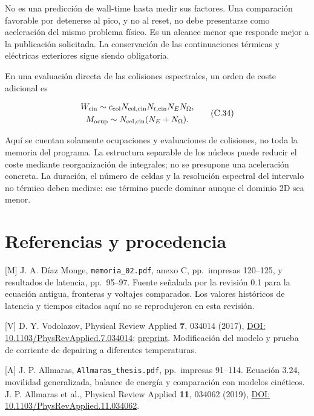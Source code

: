 \documentclass[
  spanish,
  10pt,
  a4paper,
]{article}
\begin{document}
No es una predicción de wall-time hasta medir sus factores. Una
comparación favorable por detenerse al pico, y no al reset, no debe
presentarse como aceleración del mismo problema físico. Es un alcance
menor que responde mejor a la publicación solicitada. La conservación de
las continuaciones térmicas y eléctricas exteriores sigue siendo
obligatoria.

En una evaluación directa de las colisiones espectrales, un orden de
coste adicional es

\[
\begin{gathered}
W_{\rm cin}\sim c_{\rm col}N_{\rm cel,cin}N_{t,\rm cin}N_EN_\Omega,\\
M_{\rm ocup}\sim N_{\rm cel,cin}(N_E+N_\Omega).
\end{gathered} \tag{C.34}
\]

Aquí se cuentan solamente ocupaciones y evaluaciones de colisiones, no
toda la memoria del programa. La estructura separable de los núcleos
puede reducir el coste mediante reorganización de integrales; no se
presupone una aceleración concreta. La duración, el número de celdas y
la resolución espectral del intervalo no térmico deben medirse: ese
término puede dominar aunque el dominio 2D sea menor.

\section{Referencias y procedencia}\label{referencias-y-procedencia}

{[}M{]} J. A. Díaz Monge, \nolinkurl{memoria_02.pdf}, anexo C,
pp.~impresas 120--125, y resultados de latencia, pp.~95--97. Fuente
señalada por la revisión 0.1 para la ecuación antigua, fronteras y
voltajes comparados. Los valores históricos de latencia y tiempos
citados aquí no se reprodujeron en esta revisión.

{[}V{]} D. Y. Vodolazov, Physical Review Applied \textbf{7}, 034014
(2017), \href{https://doi.org/10.1103/PhysRevApplied.7.034014}{DOI:
10.1103/PhysRevApplied.7.034014};
\href{https://arxiv.org/abs/1611.06060}{preprint}. Modificación del
modelo y prueba de corriente de depairing a diferentes temperaturas.

{[}A{]} J. P. Allmaras, \nolinkurl{Allmaras_thesis.pdf}, pp.~impresas
91--114. Ecuación 3.24, movilidad generalizada, balance de energía y
comparación con modelos cinéticos. J. P. Allmaras et al., Physical
Review Applied \textbf{11}, 034062 (2019),
\href{https://doi.org/10.1103/PhysRevApplied.11.034062}{DOI:
10.1103/PhysRevApplied.11.034062}.
\end{document}
